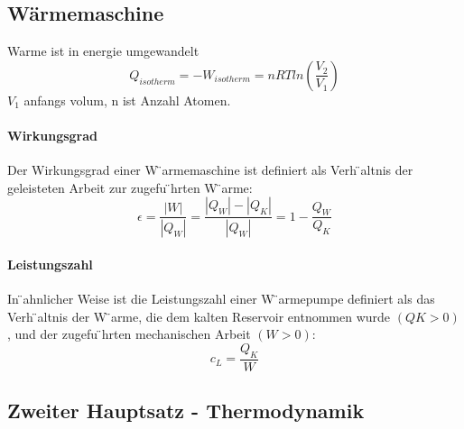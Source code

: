\documentclass[7pt]{article}
\begin{document}
\begin{multicols*}{3}
\subsection{W{\"a}rmemaschine}
Warme ist in energie umgewandelt
\begin{equation}
	Q_{isotherm}=-W_{isotherm}=nRTln(\frac{V_2}{V_1})
\end{equation}
$V_1$ anfangs volum, n ist Anzahl Atomen.
\paragraph{Wirkungsgrad}
Der Wirkungsgrad einer W ̈armemaschine ist definiert als Verh ̈altnis der geleisteten Arbeit zur zugefu ̈hrten W ̈arme:
\begin{equation}
	\epsilon=\frac{|W|}{|Q_W|}=\frac{|Q_W|-|Q_K|}{|Q_W|}=1-\frac{Q_W}{Q_K}
\end{equation}
\paragraph{Leistungszahl}
In  ̈ahnlicher Weise ist die Leistungszahl einer W ̈armepumpe definiert als das Verh ̈altnis der W ̈arme, die dem kalten Reservoir entnommen wurde $(QK > 0)$, und der zugefu ̈hrten mechanischen Arbeit $(W > 0)$:
\begin{equation}
	c_L=\frac{Q_K}{W}
\end{equation}

\subsection{Zweiter Hauptsatz - Thermodynamik}


\end{multicols*}
\end{document}
